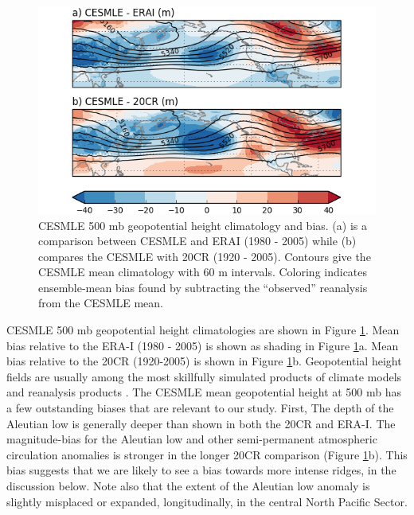 \documentclass[final, double]{ua-thesis}
\begin{document}
\begin{figure}[ht]
\centering
\centerline{\includegraphics[width=6.5in]{p3figures/fig_z500_climatology.png}}
\caption{CESMLE 500 mb geopotential height climatology and bias. (a) is a comparison between CESMLE and ERAI (1980 - 2005) while (b) compares the CESMLE with 20CR (1920 - 2005). Contours give the CESMLE mean climatology with 60 m intervals. Coloring indicates ensemble-mean bias found by subtracting the ``observed'' reanalysis from the CESMLE mean.}
\label{fig_z500_climatology}
\end{figure}

CESMLE 500 mb geopotential height climatologies are shown in Figure \ref{fig_z500_climatology}. Mean bias relative to the ERA-I (1980 - 2005) is shown as shading in Figure \ref{fig_z500_climatology}a. Mean bias relative to the 20CR (1920-2005) is shown in Figure \ref{fig_z500_climatology}b. Geopotential height fields are usually among the most skillfully simulated products of climate models and reanalysis products \citep[e.g., ][]{3kalnay_ncep/ncar_1996}. The CESMLE mean geopotential height at 500 mb has a few outstanding biases that are relevant to our study. First, The depth of the Aleutian low is generally deeper than shown in both the 20CR and ERA-I. The magnitude-bias for the Aleutian low and other semi-permanent atmospheric circulation anomalies is stronger in the longer 20CR comparison (Figure \ref{fig_z500_climatology}b). This bias suggests that we are likely to see a bias towards more intense ridges, in the discussion below. Note also that the extent of the Aleutian low anomaly is slightly misplaced or expanded, longitudinally, in the central North Pacific Sector.
\end{document}
